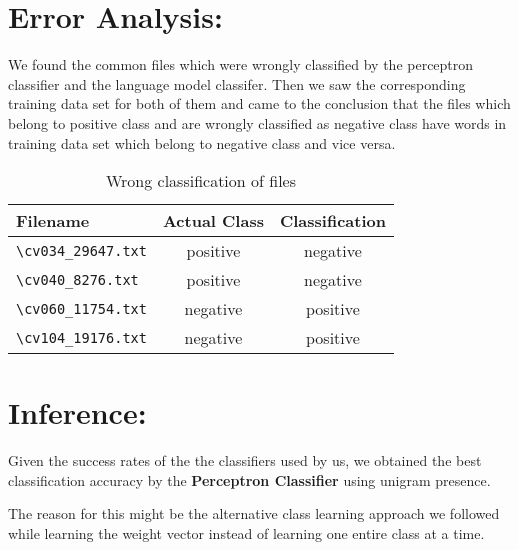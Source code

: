 \documentclass[paper=a4, fontsize=11pt]{scrartcl}
\numberwithin{equation}{section}		%
\numberwithin{figure}{section}			%
\numberwithin{table}{section}				%
\begin{document}
\section* {\bf Error Analysis:} We found the common files which were wrongly classified by the perceptron classifier and the language model classifer. Then we saw the corresponding training data set for both of them and came to the conclusion that the files which belong to positive class and are wrongly classified as negative class have words in training data set which belong to negative class and vice versa.

\begin {table}[H]
\centering
\begin{tabular}{ |l||c|c|}
\hline
{\bf Filename} & {\bf Actual Class} & {\bf Classification}  \\ \hline
\texttt{\textbackslash cv034\_29647.txt} & positive & negative \\ \hline
\texttt{\textbackslash cv040\_8276.txt}  & positive & negative \\ \hline
\texttt{\textbackslash cv060\_11754.txt} & negative & positive \\ \hline
\texttt{\textbackslash cv104\_19176.txt} & negative & positive \\ \hline
\end{tabular}
\caption{Wrong classification of files} 
\label{table:Wrong}
\end {table}


\section* {\bf Inference:}
Given the success rates of the the classifiers used by us, we obtained the best classification accuracy by the {\bf Perceptron Classifier} using unigram presence. 

The reason for this might be the alternative class learning approach we followed while learning the weight vector instead of learning one entire class at a time.



\end{document}
